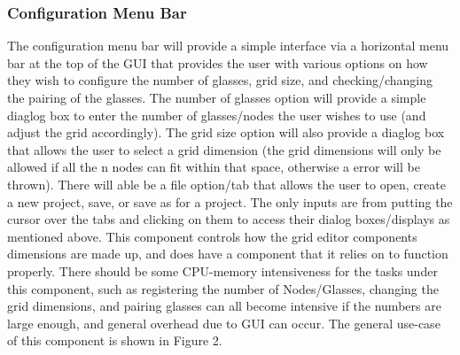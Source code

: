 \documentclass[12pt]{article}
\begin{document}
	\subsubsection {Configuration Menu Bar}
	The configuration menu bar will provide a simple interface via a horizontal menu bar at the top of the GUI that provides the user with various options on how they wish to configure the number of glasses, grid size, and checking/changing the pairing of the glasses. The number of glasses option will provide a simple diaglog box to enter the number of glasses/nodes the user wishes to use (and adjust the grid accordingly). The grid size option will also provide a diaglog box that allows the user to select a grid dimension (the grid dimensions will only be allowed if all the n nodes can fit within that space, otherwise a error will be thrown). There will able be a file option/tab that allows the user to open, create a new project, save, or save as for a project. %
	The only inputs are from putting the cursor over the tabs and clicking on them to access their dialog boxes/displays as mentioned above. This component controls how the grid editor components dimensions are made up, and does have a component that it relies on to function properly. There should be some CPU-memory intensiveness for the tasks under this component, such as registering the number of Nodes/Glasses, changing the grid dimensions, and pairing glasses can all become intensive if the numbers are large enough, and general overhead due to GUI can occur. The general use-case of this component is shown in Figure 2.
	
\end{document}
